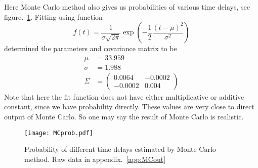 Here Monte Carlo method also gives us probabilities of various time delays, see figure.~\ref{fig:MCprob}. Fitting using function
\begin{equation*}
	f(t) = \frac{1}{\sigma \sqrt{2\pi}} \exp(-\frac{1}{2} \frac{(t-\mu)^2}{\sigma^2}) 
\end{equation*}
determined the parameters and covariance matrix to be
\begin{align*}
	\mu &= 33.959 \\
	\sigma &= 1.988 \\
	\Sigma &= \begin{pmatrix} 0.0064 & -0.0002 \\ -0.0002 & 0.004 \end{pmatrix}
\end{align*}
Note that here the fit function does not have either multiplicative or additive constant, since we have probability directly. These values are very close to direct output of Monte Carlo. So one may say the result of Monte Carlo is realistic.
\begin{figure}[ht]
	\centering
	\texttt{[image: MCprob.pdf]}
	\caption{Probability of different time delays estimated by Monte Carlo method. Raw data in appendix.~\ref{app:MCout}}%
	\label{fig:MCprob}
\end{figure}
